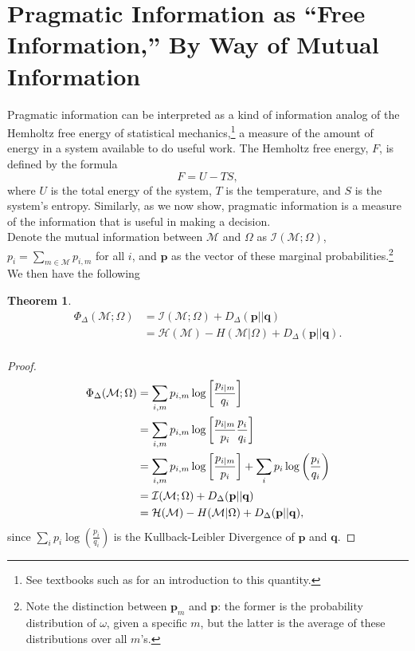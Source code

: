 \documentclass[11pt]{article}
\newtheorem{theorem}{Theorem}[subsection]
\begin{document}
\section{Pragmatic Information as ``Free Information,'' By Way of Mutual Information}
Pragmatic information can be interpreted as a kind of information analog of the Hemholtz free energy of statistical mechanics,\footnote{See textbooks such as \cite{StatMech} for an introduction to 
this quantity.} a measure of the amount of energy in a system available to do useful work.  The Hemholtz free energy, $F$, is defined by the formula
$$
F = U - TS,
$$
where $U$ is the total energy of the system, $T$ is the temperature, and $S$ is the system's entropy.  Similarly, 
as we now show, pragmatic information is a measure of the information that is useful in making a decision.
\\

Denote the mutual information between $\mathcal M$ and $\Omega$ as $\mathcal I (\mathcal M; \Omega)$, $p_i = \sum_{m \in \mathcal M} p_{i,m}$ for all $i$,
and $\mathbf p$ as the vector of these marginal probabilities.\footnote{Note the distinction between $\mathbf p_m$ and $\mathbf p$:  the former is
the probability distribution of $\omega$, given a specific $m$, but the latter is the average of these distributions over all $m$'s.}
We then have the following
\begin{theorem} \label{thm:PragInfoDecomp}
\begin{align*}
\Phi _\Delta(\mathcal M; \Omega) &= \mathcal I (\mathcal M; \Omega) + D_\Delta(\mathbf p || \mathbf q) \\
                                                 &= \mathcal H (\mathcal M) - H (\mathcal M| \Omega) + D_\Delta(\mathbf p || \mathbf q). \\
\end{align*}
\end{theorem}
\begin{proof}
\begin{align*}
 \Phi_\Delta (\mathcal M; \Omega) &= \sum_{i, m} p_{i,m} \log \left[\frac{p_{i|m}}{q_i}\right] \cr
                       &= \sum_{i, m}  p_{i,m} \log \left[\frac{p_{i|m}}{p_i}\frac{p_i}{q_i}\right] \cr
                                                  &= \sum_{i, m}  p_{i,m} \log \left[\frac{p_{i|m}}{p_i}\right] + 
								    \sum_i  p_i \log \left(\frac{p_i}{q_i}\right)    \cr
                                                  &   = \mathcal I (\mathcal M; \Omega) + D_\Delta(\mathbf p || \mathbf q) \\
                                                 &= \mathcal H (\mathcal M) - H (\mathcal M| \Omega) + D_\Delta(\mathbf p || \mathbf q), 
\end{align*}
since $\sum_i  p_i \log \left(\frac{p_i}{q_i}\right)$ is the Kullback-Leibler Divergence of $\mathbf p$ and $\mathbf q$.
\end{proof}
\end{document}
